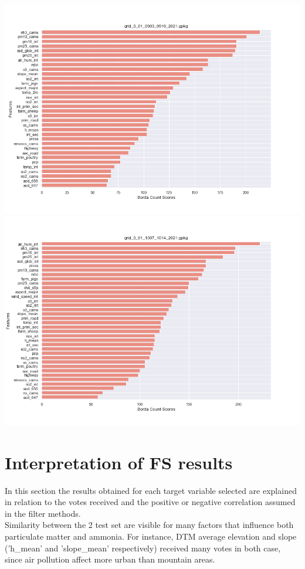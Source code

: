 \begin{center}
\includegraphics[width=.9\textwidth]{images/fs_results/nh3/001/no_montains/grid_0_01_0903_0910_2021.png}
\includegraphics[width=.9\textwidth]{images/fs_results/nh3/001/no_montains/grid_0_01_1007_1014_2021.png}
\end{center}
\section{Interpretation of FS results}
In this section the results obtained for each target variable selected are explained in relation to the votes received and the positive or negative correlation assumed in the filter methods.\\
Similarity between the 2 test set are visible for many factors that influence both particulate matter and ammonia.
For instance, DTM average elevation and slope ('h\_mean' and 'slope\_mean' respectively) received many votes in both case, since air pollution affect more urban than mountain areas.

